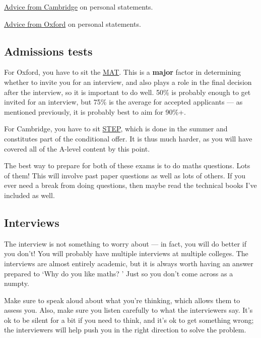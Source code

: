 \documentclass[11pt]{article}
\newif\ifshowpersonal
\newcommand{\personal}[1]{\ifshowpersonal\textcolor{myorange}{\emph{#1}}\fi}
\begin{document}
\href{https://www.undergraduate.study.cam.ac.uk/apply/how/ucas-personal-statement}{Advice from Cambridge} on personal statements. 

\href{https://www.ox.ac.uk/admissions/undergraduate/applying-to-oxford/guide/ucas-application}{Advice from Oxford} on personal statements.

\subsection{Admissions tests}

For Oxford, you have to sit the \href{https://www.maths.ox.ac.uk/study-here/undergraduate-study/maths-admissions-test}{MAT}. This is a \textbf{major} factor in determining whether to invite you for an interview, and also plays a role in the final decision after the interview, so it is important to do well. 50\% is probably enough to get invited for an interview, but 75\% is the average for accepted applicants --- as mentioned previously, it is probably best to aim for 90\%+. 

For Cambridge, you have to sit \href{https://www.maths.cam.ac.uk/undergrad/admissions/step}{STEP}, which is done in the summer and constitutes part of the conditional offer. It is thus much harder, as you will have covered all of the A-level content by this point.  

The best way to prepare for both of these exams is to do maths questions. Lots of them! This will involve past paper questions as well as lots of others. If you ever need a break from doing questions, then maybe read the technical books I've included as well.


\subsection{Interviews}

The interview is not something to worry about --- in fact, you will do better if you don't! You will probably have multiple interviews at multiple colleges. The interviews are almost entirely academic, but it is always worth having an answer prepared to ‘Why do you like maths? ’ Just so you don't come across as a numpty.

\personal{I got asked this in mine! They might also ask some other ice-breaker questions just to relax you --- your answer won't affect your interview score!}

Make sure to speak aloud about what you’re thinking, which
allows them to assess you. Also, make sure you listen carefully to what the interviewers
say. It’s ok to be silent for a bit if you need to think, and it’s ok to get something wrong; the interviewers will help push you in the right direction to solve the problem. 
\end{document}
